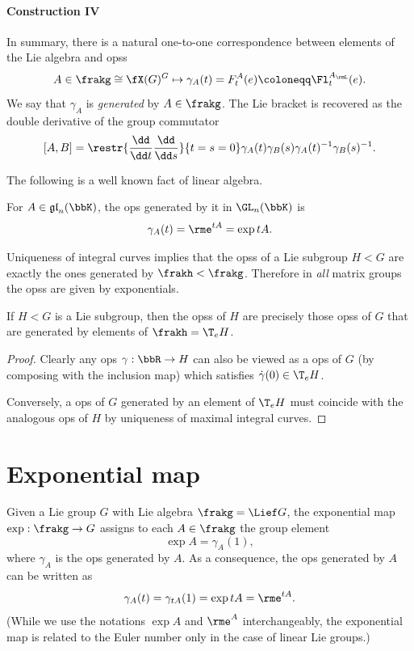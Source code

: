 \paragraph{Construction IV} In summary, there is a natural one-to-one correspondence between elements of the Lie algebra and \glspl{ops}
\[A\in \frakg\cong \fX(G)^G\mapsto \gamma_A(t)=F^A_t(e)\coloneqq \Fl^{A_\rmL}_t(e).\]
We say that $\gamma_A$ is \emph{generated} by $A\in\frakg$. The Lie bracket is recovered as the double derivative of the group commutator
\[[A,B]=\restr{\frac{\dd}{\dd t}\frac{\dd}{\dd s}}{t=s=0}\gamma_A(t)\gamma_B(s)\gamma_A(t)^{-1}\gamma_B(s)^{-1}.\]

The following is a well known fact of linear algebra.

\begin{prop}
    For $A\in \mathfrak{gl}_n(\bbK)$, the \gls{ops} generated by it in $\GL_n(\bbK)$ is
    \[\gamma_A(t)=\rme^{tA}=\exp tA.\]
\end{prop}
\begin{cor}
    Uniqueness of integral curves implies that the \glspl{ops} of a Lie subgroup $H< G$ are exactly the ones generated by $\frakh < \frakg$. Therefore in \emph{all} matrix groups the \glspl{ops} are given by exponentials.
\end{cor}

\begin{prop}\label{prop 20.3 Lee}
    If $H< G$ is a Lie subgroup, then the \glspl{ops} of $H$ are precisely those \glspl{ops} of $G$ that are generated by elements of $\frakh=\T_e H$.
\end{prop}
\begin{proof}
    Clearly any \gls{ops} $\gamma:\bbR\to H$ can also be viewed as a \gls{ops} of $G$ (by composing with the inclusion map) which satisfies $\dot\gamma(0)\in \T_e H$.

    Conversely, a \gls{ops} of $G$ generated by an element of $\T_e H$ must coincide with the analogous \gls{ops} of $H$ by uniqueness of maximal integral curves.
\end{proof}







\section{Exponential map}


\begin{defn}
    Given a Lie group $G$ with Lie algebra $\frakg=\Lief G$, the exponential map $\exp:\frakg\to G$ assigns to each $A\in \frakg$ the group element
    \[\exp A=\gamma_A(1),\]
    where $\gamma_A$ is the \gls{ops} generated by $A$. As a consequence, the \gls{ops} generated by $A$ can be written as \[\gamma_A(t)=\gamma_{tA}(1)=\exp tA=\rme^{tA}.\]
    (While we use the notations $\exp A$ and $\rme^A$ interchangeably, the exponential map is related to the Euler number only in the case of linear Lie groups.)
\end{defn}

